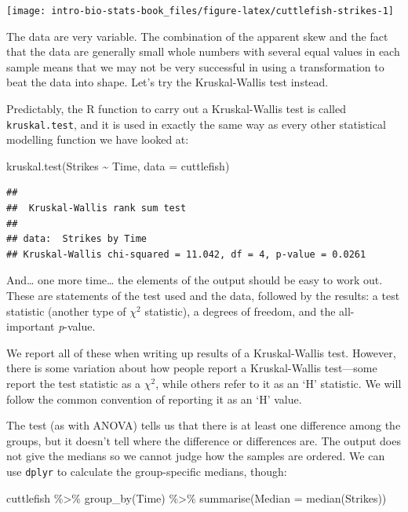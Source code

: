 \documentclass[
]{book}
\newenvironment{Shaded}{\begin{snugshade}}{\end{snugshade}}
\newcommand{\AttributeTok}[1]{\textcolor[rgb]{0.77,0.63,0.00}{#1}}
\newcommand{\FunctionTok}[1]{\textcolor[rgb]{0.00,0.00,0.00}{#1}}
\newcommand{\NormalTok}[1]{#1}
\newcommand{\SpecialCharTok}[1]{\textcolor[rgb]{0.00,0.00,0.00}{#1}}
\begin{document}
\begin{center}\texttt{[image: intro-bio-stats-book\_files/figure-latex/cuttlefish-strikes-1]} \end{center}

The data are very variable. The combination of the apparent skew and the fact that the data are generally small whole numbers with several equal values in each sample means that we may not be very successful in using a transformation to beat the data into shape. Let's try the Kruskal-Wallis test instead.

Predictably, the R function to carry out a Kruskal-Wallis test is called \texttt{kruskal.test}, and it is used in exactly the same way as every other statistical modelling function we have looked at:

\begin{Shaded}
\begin{Highlighting}[]
\FunctionTok{kruskal.test}\NormalTok{(Strikes }\SpecialCharTok{\textasciitilde{}}\NormalTok{ Time, }\AttributeTok{data =}\NormalTok{ cuttlefish)}
\end{Highlighting}
\end{Shaded}

\begin{verbatim}
## 
##  Kruskal-Wallis rank sum test
## 
## data:  Strikes by Time
## Kruskal-Wallis chi-squared = 11.042, df = 4, p-value = 0.0261
\end{verbatim}

And\ldots{} one more time\ldots{} the elements of the output should be easy to work out. These are statements of the test used and the data, followed by the results: a test statistic (another type of \(\chi^2\) statistic), a degrees of freedom, and the all-important \emph{p}-value.

We report all of these when writing up results of a Kruskal-Wallis test. However, there is some variation about how people report a Kruskal-Wallis test---some report the test statistic as a \(\chi^2\), while others refer to it as an `H' statistic. We will follow the common convention of reporting it as an `H' value.

The test (as with ANOVA) tells us that there is at least one difference among the groups, but it doesn't tell where the difference or differences are. The output does not give the medians so we cannot judge how the samples are ordered. We can use \texttt{dplyr} to calculate the group-specific medians, though:

\begin{Shaded}
\begin{Highlighting}[]
\NormalTok{cuttlefish }\SpecialCharTok{\%\textgreater{}\%} 
  \FunctionTok{group\_by}\NormalTok{(Time) }\SpecialCharTok{\%\textgreater{}\%} 
  \FunctionTok{summarise}\NormalTok{(}\AttributeTok{Median =} \FunctionTok{median}\NormalTok{(Strikes))}
\end{Highlighting}
\end{Shaded}
\end{document}

